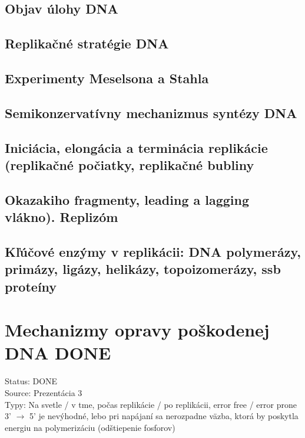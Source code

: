 \subsection{Objav úlohy DNA}

\subsection{Replikačné stratégie DNA}

\subsection{Experimenty Meselsona a Stahla}

\subsection{Semikonzervatívny mechanizmus syntézy DNA}

\subsection{Iniciácia, elongácia a terminácia replikácie (replikačné počiatky, replikačné bubliny}

\subsection{Okazakiho fragmenty, leading a lagging vlákno). Replizóm}

\subsection{Kľúčové enzýmy v replikácii: DNA polymerázy, primázy, ligázy, helikázy, topoizomerázy, ssb proteíny}

\section{Mechanizmy opravy poškodenej DNA DONE}

Status: DONE\\
Source: Prezentácia 3\\

Typy: Na svetle / v tme, počas replikácie / po replikácii, error free / error prone\\
3' $\rightarrow$ 5' je nevýhodné, lebo pri napájaní sa nerozpadne väzba, ktorá by poskytla energiu na polymerizáciu (odštiepenie fosforov)\\

